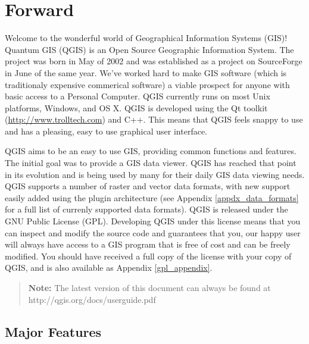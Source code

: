 
\section{Forward}\label{label_forward}
\setcounter{page}{1}

Welcome to the wonderful world of Geographical Information Systems (GIS)!
Quantum GIS (QGIS) is an Open Source Geographic Information System. The project
was born in May of 2002 and was established as a project on SourceForge in June
of the same year. We've worked hard to make GIS software (which is traditionaly
expensive commerical software) a viable prospect for anyone with basic access
to a Personal Computer. QGIS currently runs on most Unix platforms, Windows, and
OS X. QGIS is developed using the Qt toolkit (\url{http://www.trolltech.com})
and C++. This means that QGIS feels snappy to use and has a pleasing, easy to
use graphical user interface. 

QGIS aims to be an easy to use GIS, providing common functions and features.
The initial goal was to provide a GIS data viewer. QGIS has reached that point
in its evolution and is being used by many for their daily GIS data viewing
needs. QGIS supports a number of raster and vector data formats, with new
support easily added using the plugin architecture (see Appendix
\ref{appdx_data_formats} for a full list of currenly supported data formats).
QGIS is released under the GNU Public License (GPL). Developing QGIS under this
license means that you can inspect and modify the source code
and guarantees that you, our happy user will always have access to a GIS
program that is free of cost and can be freely modified. You should have
received a full copy of the license with your copy of QGIS, and is also
available as Appendix \ref{gpl_appendix}.  

\begin{quote}
\begin{center}
\textbf{Note:} The latest version of this document can always be found at \newline
http://qgis.org/docs/userguide.pdf 
\end{center}
\end{quote}

\subsection{Major Features}\label{label_majfeat}

